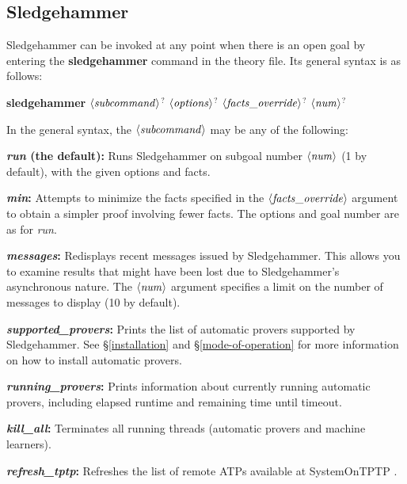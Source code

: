 \documentclass[a4paper,12pt]{article}
\def\qty#1{\ensuremath{\left<\mathit{#1\/}\right>}}
\begin{document}
\subsection{Sledgehammer}

Sledgehammer can be invoked at any point when there is an open goal by entering
the \textbf{sledgehammer} command in the theory file. Its general syntax is as
follows:

\prew
\textbf{sledgehammer} \qty{subcommand}$^?$ \qty{options}$^?$ \qty{facts\_override}$^?$ \qty{num}$^?$
\postw

In the general syntax, the \qty{subcommand} may be any of the following:

\begin{enum}
\item[\labelitemi] \textbf{\textit{run} (the default):} Runs Sledgehammer on
subgoal number \qty{num} (1 by default), with the given options and facts.

\item[\labelitemi] \textbf{\textit{min}:} Attempts to minimize the facts
specified in the \qty{facts\_override} argument to obtain a simpler proof
involving fewer facts. The options and goal number are as for \textit{run}.

\item[\labelitemi] \textbf{\textit{messages}:} Redisplays recent messages issued
by Sledgehammer. This allows you to examine results that might have been lost
due to Sledgehammer's asynchronous nature. The \qty{num} argument specifies a
limit on the number of messages to display (10 by default).

\item[\labelitemi] \textbf{\textit{supported\_provers}:} Prints the list of
automatic provers supported by Sledgehammer. See \S\ref{installation} and
\S\ref{mode-of-operation} for more information on how to install automatic
provers.

\item[\labelitemi] \textbf{\textit{running\_provers}:} Prints information about
currently running automatic provers, including elapsed runtime and remaining
time until timeout.

\item[\labelitemi] \textbf{\textit{kill\_all}:} Terminates all running
threads (automatic provers and machine learners).

\item[\labelitemi] \textbf{\textit{refresh\_tptp}:} Refreshes the list of remote
ATPs available at System\-On\-TPTP \cite{sutcliffe-2000}.
\end{enum}
\end{document}
